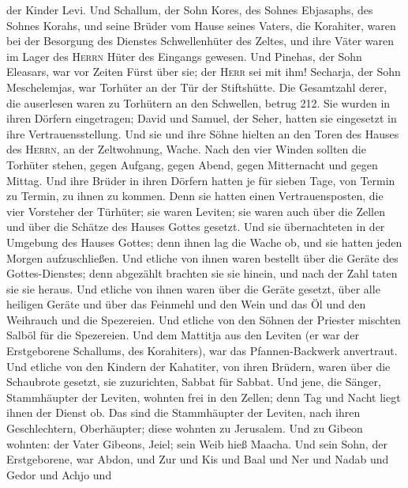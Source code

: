 der Kinder Levi.  Und Schallum, der Sohn Kores, des
Sohnes Ebjasaphs, des Sohnes Korahs, und seine Brüder vom Hause seines
Vaters, die Korahiter, waren bei der Besorgung des Dienstes
Schwellenhüter des Zeltes, und ihre Väter waren im Lager des
\textsc{Herrn} Hüter des Eingangs gewesen.  Und Pinehas,
der Sohn Eleasars, war vor Zeiten Fürst über sie; der \textsc{Herr} sei
mit ihm!  Secharja, der Sohn Meschelemjas, war Torhüter
an der Tür der Stiftshütte.  Die Gesamtzahl derer, die
auserlesen waren zu Torhütern an den Schwellen, betrug 212. Sie wurden
in ihren Dörfern eingetragen; David und Samuel, der Seher, hatten sie
eingesetzt in ihre Vertrauensstellung.  Und sie und ihre
Söhne hielten an den Toren des Hauses des \textsc{Herrn}, an der
Zeltwohnung, Wache.  Nach den vier Winden sollten die
Torhüter stehen, gegen Aufgang, gegen Abend, gegen Mitternacht und gegen
Mittag.  Und ihre Brüder in ihren Dörfern hatten je für
sieben Tage, von Termin zu Termin, zu ihnen zu kommen. 
Denn sie hatten einen Vertrauensposten, die vier Vorsteher der Türhüter;
sie waren Leviten; sie waren auch über die Zellen und über die Schätze
des Hauses Gottes gesetzt.  Und sie übernachteten in der
Umgebung des Hauses Gottes; denn ihnen lag die Wache ob, und sie hatten
jeden Morgen aufzuschließen.  Und etliche von ihnen waren
bestellt über die Geräte des Gottes-Dienstes; denn abgezählt brachten
sie sie hinein, und nach der Zahl taten sie sie heraus. 
Und etliche von ihnen waren über die Geräte gesetzt, über alle heiligen
Geräte und über das Feinmehl und den Wein und das Öl und den Weihrauch
und die Spezereien.  Und etliche von den Söhnen der
Priester mischten Salböl für die Spezereien.  Und dem
Mattitja aus den Leviten (er war der Erstgeborene Schallums, des
Korahiters), war das Pfannen-Backwerk anvertraut.  Und
etliche von den Kindern der Kahatiter, von ihren Brüdern, waren über die
Schaubrote gesetzt, sie zuzurichten, Sabbat für Sabbat. 
Und jene, die Sänger, Stammhäupter der Leviten, wohnten frei in den
Zellen; denn Tag und Nacht liegt ihnen der Dienst ob. 
Das sind die Stammhäupter der Leviten, nach ihren Geschlechtern,
Oberhäupter; diese wohnten zu Jerusalem.  Und zu Gibeon
wohnten: der Vater Gibeons, Jeiel; sein Weib hieß Maacha.
 Und sein Sohn, der Erstgeborene, war Abdon, und Zur und
Kis und Baal und Ner und Nadab  und Gedor und Achjo und
